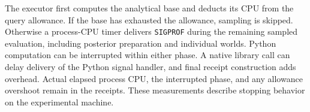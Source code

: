 The executor first computes the analytical base and deducts its CPU from the
query allowance. If the base has exhausted the allowance, sampling is skipped.
Otherwise a process-CPU timer delivers \texttt{SIGPROF} during the remaining
sampled evaluation, including posterior preparation and individual worlds.
Python computation can be interrupted within either phase. A native
library call can delay delivery of the Python signal handler, and final receipt
construction adds overhead. Actual elapsed process CPU, the interrupted phase,
and any allowance overshoot remain in the receipts. These measurements describe
stopping behavior on the experimental machine.
